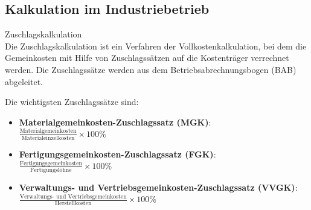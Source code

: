 \subsection{Kalkulation im Industriebetrieb}

\begin{definition}{Zuschlagskalkulation}\\
Die Zuschlagskalkulation ist ein Verfahren der Vollkostenkalkulation, bei dem die Gemeinkosten mit Hilfe von Zuschlagssätzen auf die Kostenträger verrechnet werden. Die Zuschlagssätze werden aus dem Betriebsabrechnungsbogen (BAB) abgeleitet.

Die wichtigsten Zuschlagssätze sind:
\begin{itemize}
    \item \textbf{Materialgemeinkosten-Zuschlagssatz (MGK)}: \\
    $\frac{\text{Materialgemeinkosten}}{\text{Materialeinzelkosten}} \times 100\%$
    \item \textbf{Fertigungsgemeinkosten-Zuschlagssatz (FGK)}: \\
    $\frac{\text{Fertigungsgemeinkosten}}{\text{Fertigungslöhne}} \times 100\%$
    \item \textbf{Verwaltungs- und Vertriebsgemeinkosten-Zuschlagssatz (VVGK)}: \\
    $\frac{\text{Verwaltungs- und Vertriebsgemeinkosten}}{\text{Herstellkosten}} \times 100\%$
\end{itemize}
\end{definition}

